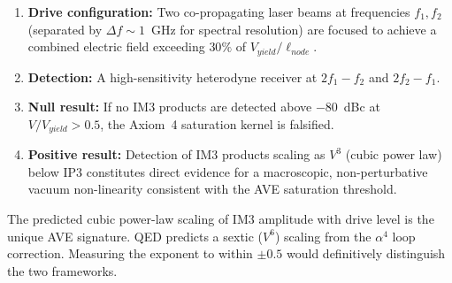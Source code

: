 \begin{enumerate}
    \item \textbf{Drive configuration:} Two co-propagating laser beams at frequencies $f_1, f_2$ (separated by $\Delta f \sim 1$~GHz for spectral resolution) are focused to achieve a combined electric field exceeding $30\%$ of $V_{yield}/\ell_{node}$.
    \item \textbf{Detection:} A high-sensitivity heterodyne receiver at $2f_1 - f_2$ and $2f_2 - f_1$.
    \item \textbf{Null result:} If no IM3 products are detected above $-80$~dBc at $V/V_{yield} > 0.5$, the Axiom~4 saturation kernel is falsified.
    \item \textbf{Positive result:} Detection of IM3 products scaling as $V^3$ (cubic power law) below IP3 constitutes direct evidence for a macroscopic, non-perturbative vacuum non-linearity consistent with the AVE saturation threshold.
\end{enumerate}

\noindent The predicted cubic power-law scaling of IM3 amplitude with drive level is the unique AVE signature. QED predicts a sextic ($V^6$) scaling from the $\alpha^4$ loop correction. Measuring the exponent to within $\pm 0.5$ would definitively distinguish the two frameworks.